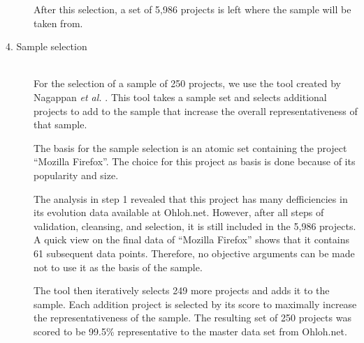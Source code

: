 \begin{description}
	After this selection, a set of 5,986 projects is left where the sample will be
	taken from.

	\item[4. Sample selection] \hfill \\ For the selection of a sample of 250
	projects, we use the tool created by Nagappan \emph{et al. }\rm\cite{nagappan}.
	This tool takes a sample set and selects additional projects to add to the
	sample that increase the overall representativeness of that sample.

	The basis for the sample selection is an atomic set containing the
	project ``Mozilla Firefox''. The choice for this project as basis is done
	because of its popularity and size.

	The analysis in step 1 revealed that this project has many defficiencies in
	its evolution data available at Ohloh.net. However, after all steps of
	validation, cleansing, and selection, it is still included in the 5,986
	projects. A quick view on the final data of ``Mozilla Firefox'' shows that it
	contains 61 subsequent data points. Therefore, no objective arguments can be
	made not to use it as the basis of the sample.

	The tool then iteratively selects 249 more projects and adds it to the sample.
	Each addition project is selected by its score to maximally increase the
	representativeness of the sample. The resulting set of 250 projects was scored
	to be 99.5\% representative to the master data set from Ohloh.net.
\end{description}

